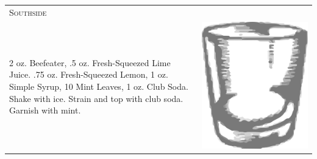 \documentclass{article}
\begin{document}
\begin{multicols}{2}
\begin{tabular}{p{2in} p{0.5in}}
 \multicolumn{2}{p{3in}}{\centering\Huge\textsc{Southside}} \\ 
   \vspace{-0.1in}2 oz. Beefeater, .5 oz. Fresh-Squeezed Lime Juice. .75 oz. Fresh-Squeezed Lemon, 1 oz. Simple Syrup, 10 Mint Leaves, 1 oz. Club Soda. Shake with ice. Strain and top with club soda. Garnish with mint. &
   \vspace{-0.1in} \includegraphics{rocks_glass.png}
\end{tabular}


\end{multicols}
\end{document}
